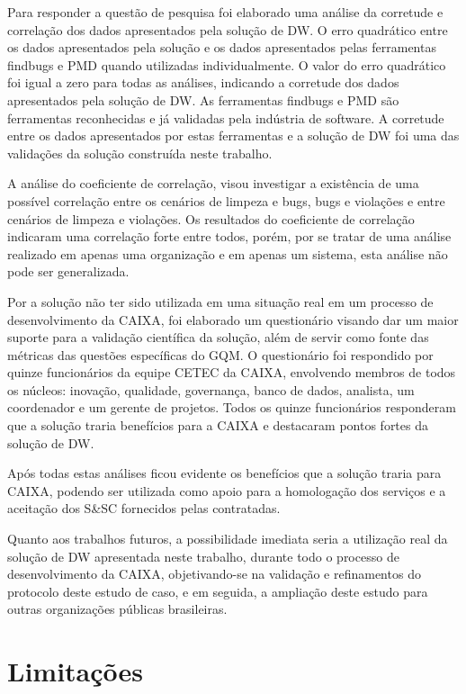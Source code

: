 Para responder a questão de pesquisa foi elaborado uma análise da corretude e correlação dos dados apresentados pela solução de DW. O erro quadrático entre os dados apresentados pela solução e os dados apresentados pelas ferramentas findbugs e PMD quando utilizadas individualmente. O valor do erro quadrático foi igual a zero para todas as análises, indicando a corretude dos dados apresentados pela solução de DW. As ferramentas findbugs e PMD são ferramentas reconhecidas e já validadas pela indústria de software. A corretude entre os dados apresentados por estas ferramentas e a solução de DW foi uma das validações da solução construída neste trabalho.

A análise do coeficiente de correlação, visou investigar a existência de uma possível correlação entre os cenários de limpeza e bugs, bugs e violações e entre cenários de limpeza e violações. Os resultados do coeficiente de correlação indicaram uma correlação forte entre todos, porém, por se tratar de uma análise realizado em apenas uma organização e em apenas um sistema, esta análise não pode ser generalizada.

Por a solução não ter sido utilizada em uma situação real em um processo de desenvolvimento da CAIXA, foi elaborado um questionário visando dar um maior suporte para a validação científica da solução, além de servir como fonte das métricas das questões específicas do GQM. O questionário foi respondido por quinze funcionários da equipe CETEC da CAIXA, envolvendo membros de todos os núcleos: inovação, qualidade, governança, banco de dados, analista, um coordenador e um gerente de projetos. Todos os quinze funcionários responderam que a solução traria benefícios para a CAIXA e destacaram pontos fortes da solução de DW.  

Após todas estas análises ficou evidente os benefícios que a solução traria para CAIXA, podendo ser utilizada como apoio para a homologação dos serviços e a aceitação dos S\&SC fornecidos pelas contratadas.  

Quanto aos trabalhos futuros, a possibilidade imediata seria a utilização real da solução de DW apresentada neste trabalho, durante todo o processo de desenvolvimento da CAIXA, objetivando-se na validação e refinamentos do protocolo deste estudo de caso, e em seguida, a ampliação deste estudo para outras organizações públicas brasileiras.  

\section{Limitações}

